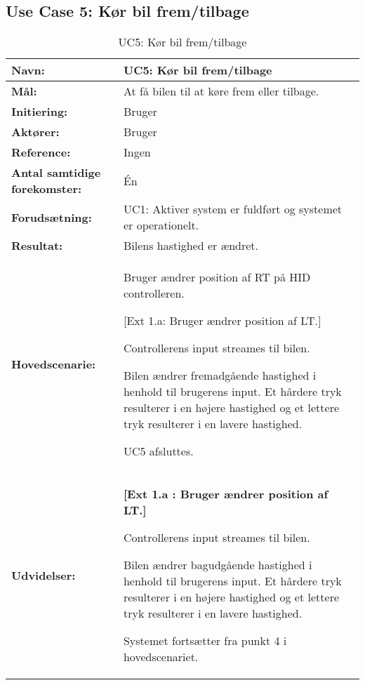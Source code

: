 \subsection{Use Case 5: Kør bil frem/tilbage}
\begin{table}[h]
\begin{tabularx}{\textwidth}{| L{3.3 cm} | Z |} \hline

\textbf{Navn:} 						& UC5: Kør bil frem/tilbage\\ \hline
\textbf{Mål:}						& At få bilen til at køre frem eller tilbage. \\ \hline
\textbf{Initiering:}				& Bruger \\ \hline
\textbf{Aktører:} 					& Bruger \\ \hline
\textbf{Reference:} 				& Ingen \\ \hline
\textbf{Antal samtidige forekomster:} & Én \\ \hline
\textbf{Forudsætning:} 				& UC1: Aktiver system er fuldført og systemet er operationelt. \\ \hline
\textbf{Resultat:}					& Bilens hastighed er ændret. \\ \hline
\textbf{Hovedscenarie:}				& 

\begin{packed_enum}
\item Bruger ændrer position af RT på HID controlleren.
	\begin{packed_item}\itemsep1pt \parskip0pt 
	\item {[}Ext 1.a: Bruger ændrer position af LT.{]}
	\end{packed_item}
\item Controllerens input streames til bilen.
\item Bilen ændrer fremadgående hastighed i henhold til brugerens input. Et hårdere tryk resulterer i en højere hastighed og et lettere tryk resulterer i en lavere hastighed.
\item UC5 afsluttes.
\end{packed_enum} \\ \hline
\textbf{Udvidelser:}				&  
\textbf{{[}Ext 1.a : Bruger ændrer position af LT.{]}}
	\begin{packed_enum}\itemsep1pt \parskip0pt 
		\item Controllerens input streames til bilen.
		\item Bilen ændrer bagudgående hastighed i henhold til brugerens input. Et hårdere tryk resulterer i en højere hastighed og et lettere tryk resulterer i en lavere hastighed.
		\item Systemet fortsætter fra punkt 4 i hovedscenariet.
	\end{packed_enum}
\\ \hline
\end{tabularx}
\caption{UC5: Kør bil frem/tilbage}
\label{tbl:UC5}
\end{table}